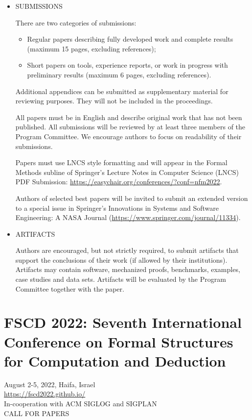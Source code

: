 \documentclass[prodmode,acmtecs]{acmsmall} %
\begin{document}
\begin{itemize}
\item  SUBMISSIONS  
 
  There are two categories of submissions: 
 
\begin{itemize}\item  Regular papers describing fully developed work and complete results (maximum 15 pages, excluding references);
\item  Short papers on tools, experience reports, or work in progress with preliminary results (maximum 6 pages, excluding references).
\end{itemize} 
  Additional appendices can be submitted as supplementary material for reviewing purposes. They will not be included in the proceedings.   
 
  All papers must be in English and describe original work that has not been published. All submissions will be reviewed by at least three members of the Program Committee. We encourage authors to focus on readability of their submissions.  
 
  Papers must use LNCS style formatting and will appear in the Formal Methods subline of Springer's Lecture Notes in Computer Science (LNCS) PDF Submission: \href{https://easychair.org/conferences/?conf=nfm2022}{https://easychair.org/conferences/?conf=nfm2022}. 
 
  Authors of selected best papers will be invited to submit an extended version to a special issue in Springer's Innovations in Systems and Software Engineering: A NASA Journal (\href{https://www.springer.com/journal/11334}{https://www.springer.com/journal/11334}). 
 
\item  ARTIFACTS 
 
  Authors are encouraged, but not strictly required, to submit artifacts that support the conclusions of their work (if allowed by their institutions). Artifacts may contain software, mechanized proofs, benchmarks, examples, case studies and data sets. Artifacts will be evaluated by the Program Committee together with the paper.  
 
\end{itemize}\section{FSCD 2022: Seventh International Conference on Formal Structures for Computation and Deduction }\label{FSCD2022}  August 2-5, 2022, Haifa, Israel\\ 
  \href{https://fscd2022.github.io/}{https://fscd2022.github.io/}\\ 
  In-cooperation with ACM SIGLOG and SIGPLAN\\ 
CALL FOR PAPERS 
\end{document}
